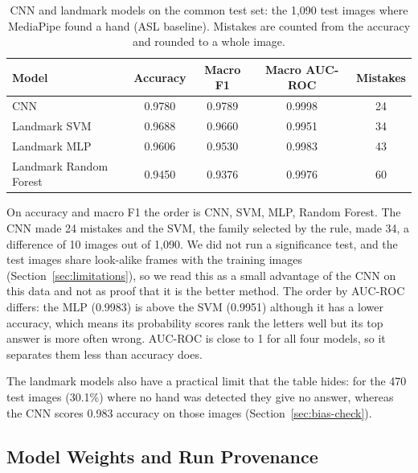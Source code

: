 \begin{table}[htbp]
  \centering
  \caption{CNN and landmark models on the common test set: the 1{,}090 test images where MediaPipe found a hand (ASL baseline). Mistakes are counted from the accuracy and rounded to a whole image.}
  \label{tab:common-set}
  \begin{tabular}{lcccc}
    \toprule
    Model & Accuracy & Macro F1 & Macro AUC-ROC & Mistakes \\
    \midrule
    CNN & 0.9780 & 0.9789 & 0.9998 & 24 \\
    Landmark SVM & 0.9688 & 0.9660 & 0.9951 & 34 \\
    Landmark MLP & 0.9606 & 0.9530 & 0.9983 & 43 \\
    Landmark Random Forest & 0.9450 & 0.9376 & 0.9976 & 60 \\
    \bottomrule
  \end{tabular}
\end{table}

On accuracy and macro F1 the order is CNN, SVM, MLP, Random Forest. The CNN made 24 mistakes and the SVM, the family selected by the rule, made 34, a difference of 10 images out of 1{,}090. We did not run a significance test, and the test images share look-alike frames with the training images (Section~\ref{sec:limitations}), so we read this as a small advantage of the CNN on this data and not as proof that it is the better method. The order by AUC-ROC differs: the MLP (0.9983) is above the SVM (0.9951) although it has a lower accuracy, which means its probability scores rank the letters well but its top answer is more often wrong. AUC-ROC is close to 1 for all four models, so it separates them less than accuracy does.

The landmark models also have a practical limit that the table hides: for the 470 test images (30.1\%) where no hand was detected they give no answer, whereas the CNN scores 0.983 accuracy on those images (Section~\ref{sec:bias-check}).

\subsection{Model Weights and Run Provenance}

